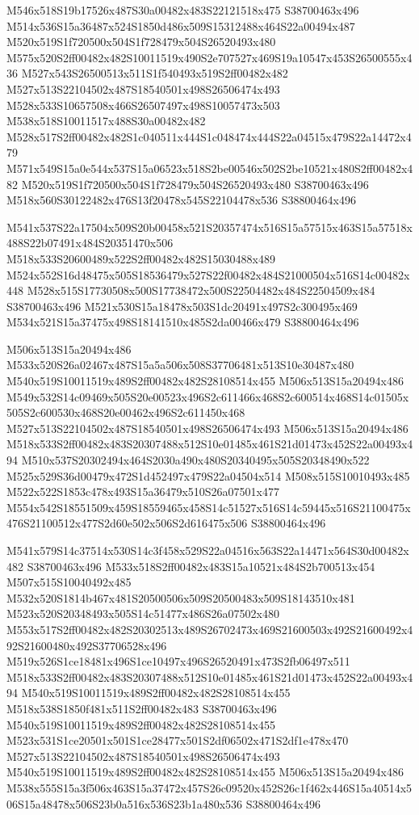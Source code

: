 \documentclass{article}
\begin{document}
\begin{multicols}{2}
M546x518S19b17526x487S30a00482x483S22121518x475 S38700463x496 M514x536S15a36487x524S1850d486x509S15312488x464S22a00494x487 M520x519S1f720500x504S1f728479x504S26520493x480 M575x520S2ff00482x482S10011519x490S2e707527x469S19a10547x453S26500555x436 M527x543S26500513x511S1f540493x519S2ff00482x482 M527x513S22104502x487S18540501x498S26506474x493 M528x533S10657508x466S26507497x498S10057473x503 M538x518S10011517x488S30a00482x482 M528x517S2ff00482x482S1c040511x444S1c048474x444S22a04515x479S22a14472x479 M571x549S15a0e544x537S15a06523x518S2be00546x502S2be10521x480S2ff00482x482 M520x519S1f720500x504S1f728479x504S26520493x480 S38700463x496 M518x560S30122482x476S13f20478x545S22104478x536 S38800464x496

M541x537S22a17504x509S20b00458x521S20357474x516S15a57515x463S15a57518x488S22b07491x484S20351470x506 M518x533S20600489x522S2ff00482x482S15030488x489 M524x552S16d48475x505S18536479x527S22f00482x484S21000504x516S14c00482x448 M528x515S17730508x500S17738472x500S22504482x484S22504509x484 S38700463x496 M521x530S15a18478x503S1dc20491x497S2c300495x469 M534x521S15a37475x498S18141510x485S2da00466x479 S38800464x496

M506x513S15a20494x486 M533x520S26a02467x487S15a5a506x508S37706481x513S10e30487x480 M540x519S10011519x489S2ff00482x482S28108514x455 M506x513S15a20494x486 M549x532S14c09469x505S20e00523x496S2c611466x468S2c600514x468S14c01505x505S2c600530x468S20e00462x496S2c611450x468 M527x513S22104502x487S18540501x498S26506474x493 M506x513S15a20494x486 M518x533S2ff00482x483S20307488x512S10e01485x461S21d01473x452S22a00493x494 M510x537S20302494x464S2030a490x480S20340495x505S20348490x522 M525x529S36d00479x472S1d452497x479S22a04504x514 M508x515S10010493x485 M522x522S1853c478x493S15a36479x510S26a07501x477 M554x542S18551509x459S18559465x458S14c51527x516S14c59445x516S21100475x476S21100512x477S2d60e502x506S2d616475x506 S38800464x496

M541x579S14c37514x530S14c3f458x529S22a04516x563S22a14471x564S30d00482x482 S38700463x496 M533x518S2ff00482x483S15a10521x484S2b700513x454 M507x515S10040492x485 M532x520S1814b467x481S20500506x509S20500483x509S18143510x481 M523x520S20348493x505S14c51477x486S26a07502x480 M553x517S2ff00482x482S20302513x489S26702473x469S21600503x492S21600492x492S21600480x492S37706528x496 M519x526S1ce18481x496S1ce10497x496S26520491x473S2fb06497x511 M518x533S2ff00482x483S20307488x512S10e01485x461S21d01473x452S22a00493x494 M540x519S10011519x489S2ff00482x482S28108514x455 M518x538S1850f481x511S2ff00482x483 S38700463x496 M540x519S10011519x489S2ff00482x482S28108514x455 M523x531S1ce20501x501S1ce28477x501S2df06502x471S2df1e478x470 M527x513S22104502x487S18540501x498S26506474x493 M540x519S10011519x489S2ff00482x482S28108514x455 M506x513S15a20494x486 M538x555S15a3f506x463S15a37472x457S26c09520x452S26c1f462x446S15a40514x506S15a48478x506S23b0a516x536S23b1a480x536 S38800464x496


\end{multicols}
\end{document}
